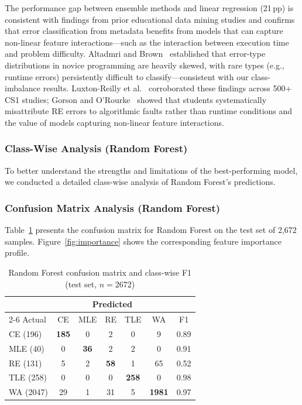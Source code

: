 \documentclass[acmsmall]{acmart}
\begin{document}
The performance gap between ensemble methods and linear regression (21\,pp)
is consistent with findings from prior educational data mining studies
and confirms that error classification from metadata benefits from models
that can capture non-linear feature interactions---such as the interaction
between execution time and problem difficulty. Altadmri and Brown~\cite{altadmri2015most} established that error-type
distributions in novice programming are heavily skewed, with rare types
(e.g., runtime errors) persistently difficult to classify---consistent with
our class-imbalance results. Luxton-Reilly et al.~\cite{luxton2018introductory} corroborated these findings
across 500+ CS1 studies; Gorson and O'Rourke~\cite{gorson2020why} showed that students
systematically misattribute RE errors to algorithmic faults rather than runtime conditions and the value of models capturing non-linear
feature interactions.

\subsubsection*{Class-Wise Analysis (Random Forest)}

To better understand the strengths and limitations of the best-performing
model, we conducted a detailed class-wise analysis of Random Forest's
predictions.

\subsubsection*{Confusion Matrix Analysis (Random Forest)}

Table~\ref{tab:rf-cm} presents the confusion matrix for Random Forest on the
test set of 2,672 samples. Figure~\ref{fig:importance} shows the corresponding
feature importance profile.

\begin{table}[htbp]
\centering
\caption{Random Forest confusion matrix and class-wise F1
 (test set, $n=2{}672$)}
\label{tab:rf-cm}
\begin{tabular}{@{}lccccc|c@{}}
\toprule
& \multicolumn{5}{c}{Predicted} & \\
\cmidrule{2-6}
Actual & CE & MLE & RE & TLE & WA & F1 \\
\midrule
CE (196) & \textbf{185} & 0 & 2 & 0 & 9 & 0.89 \\
MLE (40) & 0 & \textbf{36} & 2 & 2 & 0 & 0.91 \\
RE (131) & 5 & 2 & \textbf{58} & 1 & 65 & 0.52 \\
TLE (258) & 0 & 0 & 0 & \textbf{258} & 0 & 0.98 \\
WA (2047) & 29 & 1 & 31 & 5 & \textbf{1981} & 0.97 \\
\bottomrule
\end{tabular}
\end{table}
\end{document}
